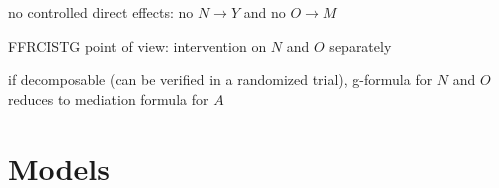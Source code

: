 \documentclass[8pt,twoside]{extarticle}
\begin{document}
\begin{multicols}{2}
{\begin{minipage}{28em}
no controlled direct effects: no $N\to Y$ and no $O\to M$

FFRCISTG point of view: intervention on $N$ and $O$ separately

if decomposable (can be verified in a randomized trial), g-formula for $N$ and $O$ reduces to mediation formula for $A$



\end{minipage}}

\end{multicols}





\section{Models}
\end{document}
